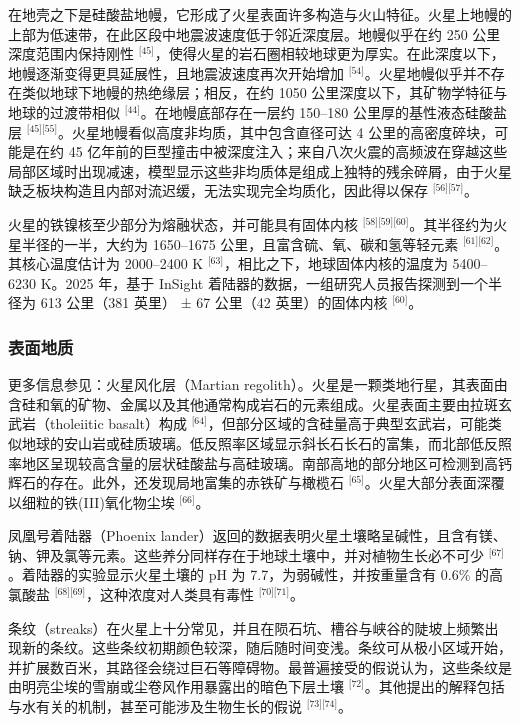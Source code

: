 在地壳之下是硅酸盐地幔，它形成了火星表面许多构造与火山特征。火星上地幔的上部为低速带，在此区段中地震波速度低于邻近深度层。地幔似乎在约 250 公里深度范围内保持刚性 \(^{\text{[45]}}\)，使得火星的岩石圈相较地球更为厚实。在此深度以下，地幔逐渐变得更具延展性，且地震波速度再次开始增加 \(^{\text{[54]}}\)。火星地幔似乎并不存在类似地球下地幔的热绝缘层；相反，在约 1050 公里深度以下，其矿物学特征与地球的过渡带相似 \(^{\text{[44]}}\)。在地幔底部存在一层约 150–180 公里厚的基性液态硅酸盐层 \(^{\text{[45][55]}}\)。火星地幔看似高度非均质，其中包含直径可达 4 公里的高密度碎块，可能是在约 45 亿年前的巨型撞击中被深度注入；来自八次火震的高频波在穿越这些局部区域时出现减速，模型显示这些非均质体是组成上独特的残余碎屑，由于火星缺乏板块构造且内部对流迟缓，无法实现完全均质化，因此得以保存 \(^{\text{[56][57]}}\)。

火星的铁镍核至少部分为熔融状态，并可能具有固体内核 \(^{\text{[58][59][60]}}\)。其半径约为火星半径的一半，大约为 1650–1675 公里，且富含硫、氧、碳和氢等轻元素 \(^{\text{[61][62]}}\)。其核心温度估计为 2000–2400 K \(^{\text{[63]}}\)，相比之下，地球固体内核的温度为 5400–6230 K。2025 年，基于 InSight 着陆器的数据，一组研究人员报告探测到一个半径为 613 公里（381 英里） ± 67 公里（42 英里）的固体内核 \(^{\text{[60]}}\)。
\subsubsection{表面地质}  
更多信息参见：火星风化层（Martian regolith）。火星是一颗类地行星，其表面由含硅和氧的矿物、金属以及其他通常构成岩石的元素组成。火星表面主要由拉斑玄武岩（tholeiitic basalt）构成 \(^{\text{[64]}}\)，但部分区域的含硅量高于典型玄武岩，可能类似地球的安山岩或硅质玻璃。低反照率区域显示斜长石长石的富集，而北部低反照率地区呈现较高含量的层状硅酸盐与高硅玻璃。南部高地的部分地区可检测到高钙辉石的存在。此外，还发现局地富集的赤铁矿与橄榄石 \(^{\text{[65]}}\)。火星大部分表面深覆以细粒的铁(III)氧化物尘埃 \(^{\text{[66]}}\)。

凤凰号着陆器（Phoenix lander）返回的数据表明火星土壤略呈碱性，且含有镁、钠、钾及氯等元素。这些养分同样存在于地球土壤中，并对植物生长必不可少 \(^{\text{[67]}}\)。着陆器的实验显示火星土壤的 pH 为 7.7，为弱碱性，并按重量含有 0.6\% 的高氯酸盐 \(^{\text{[68][69]}}\)，这种浓度对人类具有毒性 \(^{\text{[70][71]}}\)。

条纹（streaks）在火星上十分常见，并且在陨石坑、槽谷与峡谷的陡坡上频繁出现新的条纹。这些条纹初期颜色较深，随后随时间变浅。条纹可从极小区域开始，并扩展数百米，其路径会绕过巨石等障碍物。最普遍接受的假说认为，这些条纹是由明亮尘埃的雪崩或尘卷风作用暴露出的暗色下层土壤 \(^{\text{[72]}}\)。其他提出的解释包括与水有关的机制，甚至可能涉及生物生长的假说 \(^{\text{[73][74]}}\)。


